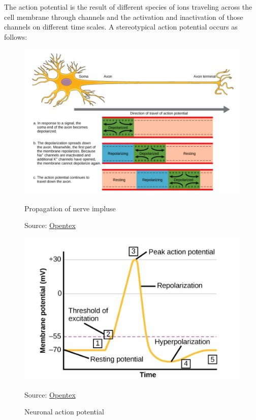 \documentclass[paper=a4, fontsize=11pt]{scrartcl} %
\numberwithin{equation}{section} %
\numberwithin{figure}{section} %
\numberwithin{table}{section} %
\begin{document}
\vspace{10pt}
The action potential is the result of different species of ions traveling across the cell membrane through channels and the activation and inactivation of those channels on different time scales. A stereotypical action potential occurs as follows:

\begin{figure}[H]
    \centering
    \begin{minipage}[b]{0.45\textwidth}
      \centering
      \includegraphics[width=\textwidth]{./data/propagation-of-nerve-impluse.jpg}
      \caption{Propagation of nerve impluse}
      \label{fig:exampleA}
      \vspace{1pt} %
      \small{Source: \href{https://opentextbc.ca/biology/chapter/16-2-how-neurons-communicate/}{Opentex}}
    \end{minipage}
    \hfill
    \begin{minipage}[b]{0.45\textwidth}
      \centering
      \includegraphics[width=\textwidth]{./data/neuronal-action-potential.jpg}
      \caption{Neuronal action potential}
      \label{fig:exampleB}
      \vspace{1pt} %
      \small{Source: \href{https://opentextbc.ca/biology/chapter/16-2-how-neurons-communicate/}{Opentex}}
    \end{minipage}
\end{figure}
\end{document}
